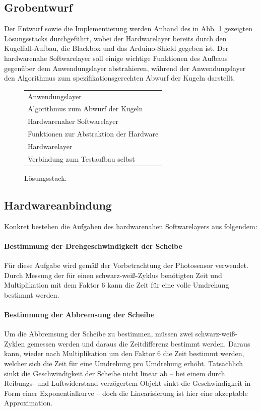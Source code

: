 \documentclass{kis}
\begin{document}
\subsection{Grobentwurf}
Der Entwurf sowie die Implementierung werden Anhand des in Abb. \ref{fig:lösungsstack} gezeigten Lösungsstacks durchgeführt, wobei der Hardwarelayer bereits durch den Kugelfall-Aufbau, die Blackbox und das Arduino-Shield gegeben ist. Der hardwarenahe Softwarelayer soll einige wichtige Funktionen des Aufbaus gegenüber dem Anwendungslayer abstrahieren, während der Anwendungslayer den Algorithmus zum spezifikationsgerechten Abwurf der Kugeln darstellt.

\begin{figure}
	\centering
	\renewcommand{\arraystretch}{1.7}
	\begin{tabularx}{0.8\textwidth}{|Y|}
		\hline
		\large Anwendungslayer\\
		\small Algorithmus zum Abwurf der Kugeln\\
		\hline
		\large Hardwarenaher Softwarelayer\\
		\small Funktionen zur Abstraktion der Hardware\\
		\hline
		\large Hardwarelayer\\
		\small Verbindung zum Testaufbau selbst\\
		\hline
	\end{tabularx}
	\caption{Lösungsstack.}
	\label{fig:lösungsstack}
\end{figure}

\subsection{Hardwareanbindung}
Konkret bestehen die Aufgaben des hardwarenahen Softwarelayers aus folgendem:

\paragraph{Bestimmung der Drehgeschwindigkeit der Scheibe}
Für diese Aufgabe wird gemäß der Vorbetrachtung der Photosensor verwendet. Durch Messung der für einen schwarz-weiß-Zyklus benötigten Zeit und Multiplikation mit dem Faktor 6 kann die Zeit für eine volle Umdrehung bestimmt werden.

\paragraph{Bestimmung der Abbremsung der Scheibe}
Um die Abbremsung der Scheibe zu bestimmen, müssen zwei schwarz-weiß-Zyklen gemessen werden und daraus die Zeitdifferenz bestimmt werden. Daraus kann, wieder nach Multiplikation um den Faktor 6 die Zeit bestimmt werden, welcher sich die Zeit für eine Umdrehung pro Umdrehung erhöht. Tatsächlich sinkt die Geschwindigkeit der Scheibe nicht linear ab -- bei einem durch Reibungs- und Luftwiderstand verzögertem Objekt sinkt die Geschwindigkeit in Form einer Exponentialkurve -- doch die Linearisierung ist hier eine akzeptable Approximation.
\end{document}
